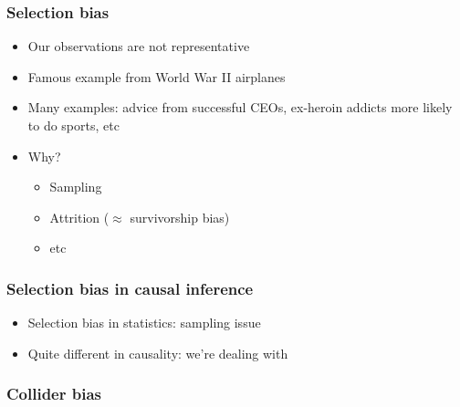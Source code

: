 \documentclass[aspectratio=43]{beamer}
\begin{document}
\begin{frame}
\frametitle{Selection bias}\label{selectbias}
\centering

\begin{itemize}
  \item Our observations are not representative
  \item Famous example from World War II airplanes
  \item Many examples: advice from successful CEOs, ex-heroin addicts more likely to do sports, etc
  \item Why?
  \begin{itemize}
    \item Sampling
    \item Attrition ($\approx$ survivorship bias)
    \item etc
  \end{itemize}
\end{itemize}

\end{frame}


\begin{frame}
\frametitle{Selection bias in causal inference}
\centering

\begin{itemize}
  \item Selection bias in statistics: sampling issue
  \item Quite different in causality: we're dealing with 
\end{itemize}

\end{frame}

\begin{frame}
\frametitle{Collider bias}\label{collider}
\centering


\end{frame}


%
%
\end{document}
